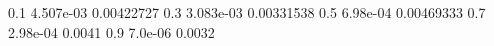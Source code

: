 0.1 4.507e-03 0.00422727
0.3 3.083e-03 0.00331538
0.5 6.98e-04 0.00469333
0.7 2.98e-04 0.0041
0.9 7.0e-06 0.0032